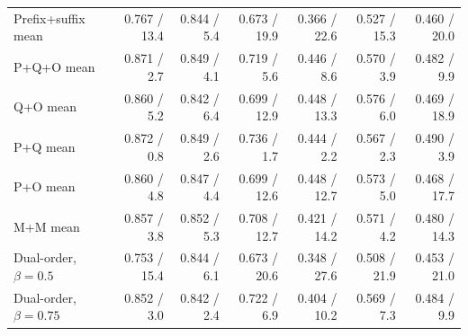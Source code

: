 \begin{tabular}{lrrrrrr}
Prefix+suffix mean & 0.767 / 13.4 & 0.844 / 5.4 & 0.673 / 19.9 & 0.366 / 22.6 & 0.527 / 15.3 & 0.460 / 20.0 \\
P+Q+O mean & 0.871 / 2.7 & 0.849 / 4.1 & 0.719 / 5.6 & 0.446 / 8.6 & 0.570 / 3.9 & 0.482 / 9.9 \\
Q+O mean & 0.860 / 5.2 & 0.842 / 6.4 & 0.699 / 12.9 & 0.448 / 13.3 & 0.576 / 6.0 & 0.469 / 18.9 \\
P+Q mean & 0.872 / 0.8 & 0.849 / 2.6 & 0.736 / 1.7 & 0.444 / 2.2 & 0.567 / 2.3 & 0.490 / 3.9 \\
P+O mean & 0.860 / 4.8 & 0.847 / 4.4 & 0.699 / 12.6 & 0.448 / 12.7 & 0.573 / 5.0 & 0.468 / 17.7 \\
M+M mean & 0.857 / 3.8 & 0.852 / 5.3 & 0.708 / 12.7 & 0.421 / 14.2 & 0.571 / 4.2 & 0.480 / 14.3 \\
Dual-order, $\beta{=}0.5$ & 0.753 / 15.4 & 0.844 / 6.1 & 0.673 / 20.6 & 0.348 / 27.6 & 0.508 / 21.9 & 0.453 / 21.0 \\
Dual-order, $\beta{=}0.75$ & 0.852 / 3.0 & 0.842 / 2.4 & 0.722 / 6.9 & 0.404 / 10.2 & 0.569 / 7.3 & 0.484 / 9.9 \\
\bottomrule
\end{tabular}

